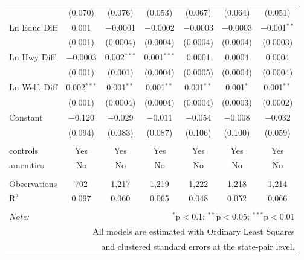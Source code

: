 \begin{table}[!htbp]
\begin{tabular}{@{\extracolsep{5pt}}lcccccc}
  & (0.070) & (0.076) & (0.053) & (0.067) & (0.064) & (0.051) \\ 
  Ln Educ Diff & 0.001 & $-$0.0001 & $-$0.0002 & $-$0.0003 & $-$0.0003 & $-$0.001$^{**}$ \\ 
  & (0.001) & (0.0004) & (0.0004) & (0.0004) & (0.0004) & (0.0003) \\ 
  Ln Hwy Diff & $-$0.0003 & 0.002$^{***}$ & 0.001$^{***}$ & 0.0001 & 0.0004 & 0.0004 \\ 
  & (0.001) & (0.001) & (0.0004) & (0.0005) & (0.0004) & (0.0004) \\ 
  Ln Welf. Diff & 0.002$^{***}$ & 0.001$^{**}$ & 0.001$^{**}$ & 0.001$^{**}$ & 0.001$^{*}$ & 0.001$^{**}$ \\ 
  & (0.001) & (0.0004) & (0.0004) & (0.0004) & (0.0003) & (0.0002) \\ 
  Constant & $-$0.120 & $-$0.029 & $-$0.011 & $-$0.054 & $-$0.008 & $-$0.032 \\ 
  & (0.094) & (0.083) & (0.087) & (0.106) & (0.100) & (0.059) \\ 
 \hline \\[-1.8ex] 
controls & Yes & Yes & Yes & Yes & Yes & Yes \\ 
amenities & No & No & No & No & No & No \\ 
\hline \\[-1.8ex] 
Observations & 702 & 1,217 & 1,219 & 1,222 & 1,218 & 1,214 \\ 
R$^{2}$ & 0.097 & 0.060 & 0.065 & 0.048 & 0.052 & 0.066 \\ 
\hline 
\hline \\[-1.8ex] 
\textit{Note:}  & \multicolumn{6}{r}{$^{*}$p$<$0.1; $^{**}$p$<$0.05; $^{***}$p$<$0.01} \\ 
 & \multicolumn{6}{r}{All models are estimated with Ordinary Least Squares} \\ 
 & \multicolumn{6}{r}{and clustered standard errors at the state-pair level.} \\ 
\end{tabular} 
\end{table} 
